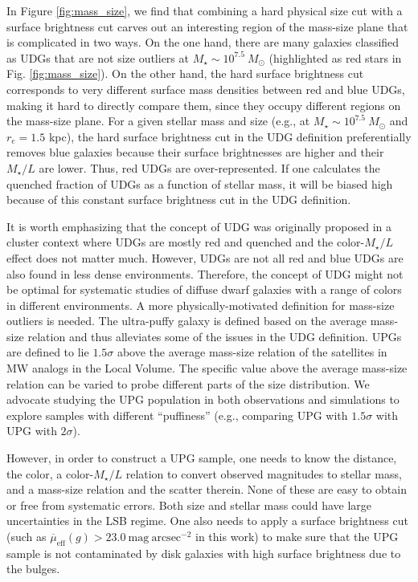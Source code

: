 \documentclass[twocolumn,astrosymb,twocolappendix]{aastex631}
\newcommand{\sbunit}{\mathrm{mag\ arcsec}^{-2}}
\newcommand{\sbeff}{\overline{\mu}_{\mathrm{eff}}(g)}
\begin{document}
\begin{CJK*}{UTF8}{gbsn}
In Figure \ref{fig:mass_size}, we find that combining a hard physical size cut with a surface brightness cut carves out an interesting region of the mass-size plane that is complicated in two ways. On the one hand, there are many galaxies classified as UDGs that are not size outliers at $M_\star \sim 10^{7.5}\ M_\odot$ (highlighted as red stars in Fig. \ref{fig:mass_size}). On the other hand, the hard surface brightness cut corresponds to very different surface mass densities between red and blue UDGs, making it hard to directly compare them, since they occupy different regions on the mass-size plane. For a given stellar mass and size (e.g., at $M_\star \sim 10^{7.5}\ M_\odot$ and $r_e = 1.5$ kpc), the hard surface brightness cut in the UDG definition preferentially removes blue galaxies because their surface brightnesses are higher and their $M_\star/L$ are lower. Thus, red UDGs are over-represented. If one calculates the quenched fraction of UDGs as a function of stellar mass, it will be biased high because of this constant surface brightness cut in the UDG definition.

It is worth emphasizing that the concept of UDG was originally proposed in a cluster context where UDGs are mostly red and quenched \citep[e.g.,][]{vanDokkum2015} and the color-$M_\star/L$ effect does not matter much. However, UDGs are not all red and blue UDGs are also found in less dense environments. Therefore, the concept of UDG might not be optimal for systematic studies of diffuse dwarf galaxies with a range of colors in different environments. A more physically-motivated definition for mass-size outliers is needed. The ultra-puffy galaxy is defined based on the average mass-size relation and thus alleviates some of the issues in the UDG definition. UPGs are defined to lie $1.5\sigma$ above the average mass-size relation of the satellites in MW analogs in the Local Volume. The specific value above the average mass-size relation can be varied to probe different parts of the size distribution. We advocate studying the UPG population in both observations and simulations to explore samples with different ``puffiness'' (e.g., comparing UPG with $1.5\sigma$ with UPG with $2\sigma$). 


However, in order to construct a UPG sample, one needs to know the distance, the color, a color-$M_\star/L$ relation to convert observed magnitudes to stellar mass, and a mass-size relation and the scatter therein. None of these are easy to obtain or free from systematic errors. Both size and stellar mass could have large uncertainties in the LSB regime. One also needs to apply a surface brightness cut (such as $\sbeff > 23.0\ \sbunit$ in this work) to make sure that the UPG sample is not contaminated by disk galaxies with high surface brightness due to the bulges. 


\end{CJK*}
\end{document}
